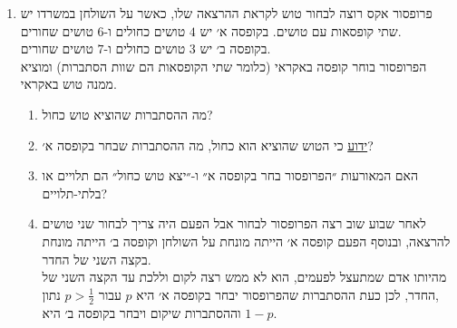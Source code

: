 \documentclass[12pt, a4paper]{article}
\newcommand{\PP}{\mathbb{P}}
\begin{document}
\begin{enumerate}
\begin{enumerate}
נרצה לחשב את ההסתברות
$\PP(A_1\cap A_2\cap A_3)$.
ראשית, נשתמש במאורע המשלים ונקבל
$$.\PP(A_1\cap A_2\cap A_3)
=1-\PP(A_1^C\cup A_2^C\cup A_3^C)$$
כעת נשתמש בעקרון ההכלה וההדחה
\begin{multline*}
\PP(A_1^C\cup A_2^C\cup A_3^C)
=\PP(A_1^C)+\PP(A_2^C)+\PP(A_3^C)
\\-\PP(A_1\cap A_2^C)-
\PP(A_1^C\cap A_3^C)
-\PP(A_2^C\cap A_3^C)
\\+\PP(A_1\cap A_2^C\cap A_3^C)
\end{multline*}
\end{enumerate}
כל אחד מהמאורעות
$A_1^C, A_2^C, A_3^C$
אומר שלא תגיע אף מתמטיקאית לסניף הראשון/השני/השלישי, ובדומה לסעיף ב׳ שם חישבנו את ההסתברות הזו נקבל
$$.\PP(A_1^C)=\PP(A_2^C)=\PP(A_3^C)=\left(\frac{2}{3}\right)^{10}$$
כל אחד מהמאורעות
$A_1^C\cap A_2^C, A_1^C\cap A_3^C, A_2^C\cap A_3^C$
אומר שלא תגיע אף מתמטיקאית לשניים מהסניפים (הראשון והשני/ הראשון והשלישי/ השני והשלישי), ובמילים אחרות שכולן תגענה לסניף השלישי, לכן
$$.\PP(A_1^C\cap A_2^C)
=\PP(A_1^\cap A_3^C)=\PP(A_2^C\cap A_3^C)=\frac{1}{3^{10}}$$
לסיום, המאורע
$A_1^C\cap A_2^C\cap A_3^C$
הוא מאורע ריק ולכן הסתברותו שווה
$0$,
אז נקבל
$$\boxed{\PP(A_1\cap A_2\cap A_3)=
1-\left(
3\cdot \left(\frac{2}{3}\right)^{10}
-3\cdot \left(\frac{1}{3}\right)^{10}
\right)
=
\frac{3^9-2^{10}+1}{3^{9}}}$$
\newpage

\item
פרופסור אקס רוצה לבחור טוש לקראת ההרצאה שלו, כאשר על השולחן במשרדו
יש שתי קופסאות עם טושים. בקופסה א׳ יש
$4$
טושים
כחולים
ו-$6$
טושים שחורים.
\\
בקופסה ב׳ יש
$3$
טושים כחולים
ו-$7$
טושים שחורים.
\\
הפרופסור  בוחר קופסה באקראי (כלומר שתי הקופסאות הם שוות הסתברות)  ומוציא ממנה טוש באקראי. 
\begin{enumerate}
\item
מה ההסתברות שהוציא טוש כחול?
\item
\underline{ידוע} כי הטוש שהוציא הוא כחול, מה ההסתברות  שבחר בקופסה א׳?
\item
האם המאורעות ״הפרופסור בחר בקופסה א״ ו-״יצא טוש כחול״ הם תלויים או בלתי-תלויים?
\item
לאחר שבוע שוב רצה הפרופסור לבחור אבל הפעם היה צריך לבחור שני טושים להרצאה, ובנוסף הפעם קופסה א׳ הייתה מונחת על השולחן וקופסה ב׳ הייתה מונחת בקצה השני של החדר.
\\
מהיותו אדם שמתעצל לפעמים, הוא לא ממש רצה לקום וללכת עד הקצה השני של החדר, לכן כעת ההסתברות שהפרופסור יבחר בקופסה א׳ היא 
$p$
עבור
$p>\frac{1}{2}$ נתון,
\\
וההסתברות שיקום ויבחר בקופסה ב׳ היא
$1-p$.


\end{enumerate}
\end{enumerate}
\end{document}
